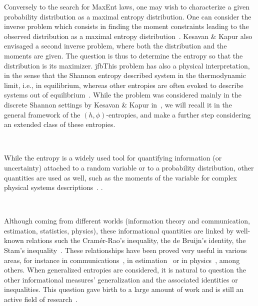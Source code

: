 \documentclass[english,sort&compress]{elsarticle}
\theoremstyle{definition}
\theoremstyle{plain}
\theoremstyle{plain}
\begin{document}
{Conversely to the search for MaxEnt laws, one may wish to characterize a given probability distribution as a maximal entropy distribution. 
One can consider the inverse problem which consists in finding the moment constraints leading to the observed distribution as a maximal entropy distribution~\cite{KesKap89}. 
Kesavan \& Kapur also envisaged a second inverse problem, where both the distribution and the moments are given. 
The question is thus to determine the entropy so that the distribution is its
maximizer. jfb{This problem has also a physical interpretation, in the sense that
 the Shannon entropy described system in the thermodynamic limit, i.e., in
 equilibrium, whereas other entropies are often evoked to describe systems out
 of equilibrium~\cite{Tsa88, TsaMen98, Tsa99, Tsa09, EssSch00, ParBir05}.}
 While the problem was considered mainly in the discrete Shannon settings by
 Kesavan \& Kapur in~\cite{KesKap89}, we will recall it 
 in the general framework of the $(h,\phi)$-entropies, and make a further step considering
 an extended class of these entropies.
}

\

While  the  entropy is  a  widely used  tool for  quantifying information (or
uncertainty) attached to a  random variable or  to a  probability distribution,
other  quantities are  used as well,  such  as the  moments  of the  variable
 for  complex  physical
systems descriptions~\cite{Fri04,  VigBer03,  RomAng99,   RomSan06,  SanGon06,
  TorLop15}.  .

\

Although  coming from different worlds (information theory  and communication,
estimation, statistics, physics), these informational quantities are linked
by well-known relations such the Cram\'er-Rao's inequality, the de
Bruijn's  identity,  the   Stam's  inequality~\cite{CovTho06,  Sta59,  DemCov91,
  GuoSha05}.   
These relationships  have  been proved  very  useful in  various
areas,  for  instance  in  communications~\cite{Sta59, DemCov91,  CovTho06},  in
estimation~\cite{Kay93} or in physics~\cite{FolSit97, Sen11}, among others. When
generalized entropies are considered, it is natural to question the other informational measures' generalization and the associated identities or inequalities. This question  gave birth to a large amount of work and is still an active field
of research~\cite{Vaj73,  Boe77, Ham78, BoeVan80,  BurRao82, LutYan04, LutYan05,
  LutYan07, LutLv12, Ber12:06_1, Ber12:06_2, Ber13, Ber13:08}.  
\end{document}
